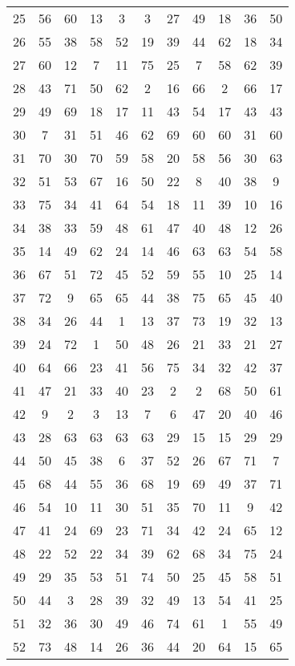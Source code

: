 \begin{table}
\begin{tabular}{c c c c c c c c c c c }
25 & 56 & 60 & 13 & 3 & 3 & 27 & 49 & 18 & 36 & 50 \\
26 & 55 & 38 & 58 & 52 & 19 & 39 & 44 & 62 & 18 & 34 \\
27 & 60 & 12 & 7 & 11 & 75 & 25 & 7 & 58 & 62 & 39 \\
28 & 43 & 71 & 50 & 62 & 2 & 16 & 66 & 2 & 66 & 17 \\
29 & 49 & 69 & 18 & 17 & 11 & 43 & 54 & 17 & 43 & 43 \\
30 & 7 & 31 & 51 & 46 & 62 & 69 & 60 & 60 & 31 & 60 \\
31 & 70 & 30 & 70 & 59 & 58 & 20 & 58 & 56 & 30 & 63 \\
32 & 51 & 53 & 67 & 16 & 50 & 22 & 8 & 40 & 38 & 9 \\
33 & 75 & 34 & 41 & 64 & 54 & 18 & 11 & 39 & 10 & 16 \\
34 & 38 & 33 & 59 & 48 & 61 & 47 & 40 & 48 & 12 & 26 \\
35 & 14 & 49 & 62 & 24 & 14 & 46 & 63 & 63 & 54 & 58 \\
36 & 67 & 51 & 72 & 45 & 52 & 59 & 55 & 10 & 25 & 14 \\
37 & 72 & 9 & 65 & 65 & 44 & 38 & 75 & 65 & 45 & 40 \\
38 & 34 & 26 & 44 & 1 & 13 & 37 & 73 & 19 & 32 & 13 \\
39 & 24 & 72 & 1 & 50 & 48 & 26 & 21 & 33 & 21 & 27 \\
40 & 64 & 66 & 23 & 41 & 56 & 75 & 34 & 32 & 42 & 37 \\
41 & 47 & 21 & 33 & 40 & 23 & 2 & 2 & 68 & 50 & 61 \\
42 & 9 & 2 & 3 & 13 & 7 & 6 & 47 & 20 & 40 & 46 \\
43 & 28 & 63 & 63 & 63 & 63 & 29 & 15 & 15 & 29 & 29 \\
44 & 50 & 45 & 38 & 6 & 37 & 52 & 26 & 67 & 71 & 7 \\
45 & 68 & 44 & 55 & 36 & 68 & 19 & 69 & 49 & 37 & 71 \\
46 & 54 & 10 & 11 & 30 & 51 & 35 & 70 & 11 & 9 & 42 \\
47 & 41 & 24 & 69 & 23 & 71 & 34 & 42 & 24 & 65 & 12 \\
48 & 22 & 52 & 22 & 34 & 39 & 62 & 68 & 34 & 75 & 24 \\
49 & 29 & 35 & 53 & 51 & 74 & 50 & 25 & 45 & 58 & 51 \\
50 & 44 & 3 & 28 & 39 & 32 & 49 & 13 & 54 & 41 & 25 \\
51 & 32 & 36 & 30 & 49 & 46 & 74 & 61 & 1 & 55 & 49 \\
52 & 73 & 48 & 14 & 26 & 36 & 44 & 20 & 64 & 15 & 65 \\

\end{tabular}
\end{table}
